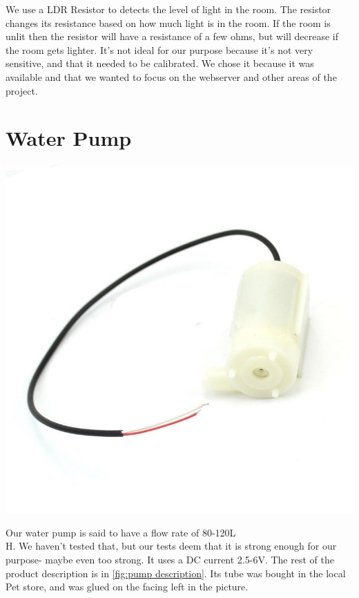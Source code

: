 \documentclass[a4paper,12pt,twoside,openright,titlepage]{book}
\begin{document}
We use a LDR Resistor to detects the level of light in the room. The resistor changes its resistance based on how much light is in the room. If the room is unlit then the resistor will have a resistance of a few ohms, but will decrease if the room gets lighter. It's not ideal for our purpose because it's not very sensitive, and that it needed to be calibrated. We chose it because it was available and that we wanted to focus on the webserver and other areas of the project.

\section{Water Pump}
\includegraphics[scale=0.3]{Water-Pump}

Our water pump is said to have a flow rate of 80-120L\\H. We haven't tested that, but our tests deem that it is strong enough for our purpose- maybe even too strong. It uses a DC current 2.5-6V. The rest of the product description is in \ref{fig:pump description}. Its tube was bought in the local Pet store, and was glued on the facing  left in the picture.
\end{document}
